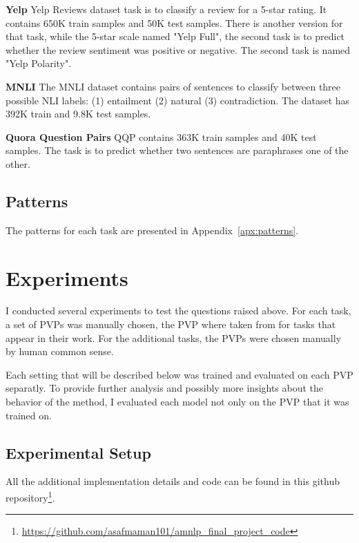 \documentclass[11pt,a4paper]{article}
\begin{document}
\vspace{8pt}
\noindent \textbf{Yelp} \quad
Yelp Reviews dataset task is to classify a review for a 5-star rating.
It contains 650K train samples and 50K test samples.
There is another version for that task, while the 5-star scale named "Yelp Full", the second task is to predict whether the review sentiment was positive or negative.
The second task is named "Yelp Polarity".

\vspace{8pt}
\noindent \textbf{MNLI} \quad
The MNLI dataset contains pairs of sentences to classify between three possible NLI labels: (1) entailment (2) natural (3) contradiction. 
The dataset has 392K train and 9.8K test samples. 

\vspace{8pt}
\noindent \textbf{Quora Question Pairs} \quad
QQP contains 363K train samples and 40K test samples.
The task is to predict whether two sentences are paraphrases one of the other.

\subsection{Patterns}
The patterns for each task are presented in Appendix~\ref{apx:patterns}.


\section{Experiments}
\label{sec:experiments}

I conducted several experiments to test the questions raised above.
For each task, a set of PVPs was manually chosen, the PVP where taken from \citet{schick2020exploiting} for tasks that appear in their work.
For the additional tasks, the PVPs were chosen manually by human common sense. 

Each setting that will be described below was trained and evaluated on each PVP separatly.
To provide further analysis and possibly more insights about the behavior of the method, I evaluated each model not only on the PVP that it was trained on.

\subsection{Experimental Setup}
\label{sub-sec:experimental-setup}

All the additional implementation details and code can be found in this github repository\footnote{\url{https://github.com/asafmaman101/amnlp_final_project_code}}.
\end{document}
